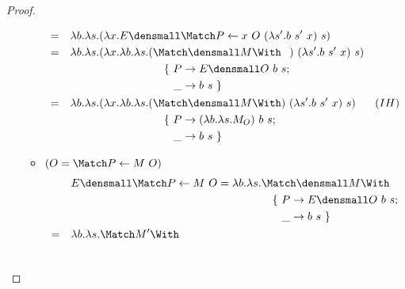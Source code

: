 \begin{proof}
\begin{enumerate}[(a)]
\begin{itemize}
\begin{align*}
            =& \quad \lambda b. \lambda s. (\lambda x. E\den{\Match P \gets x ~ O} ~ (\lambda s'. b ~ s' ~ x) ~ s) \\
            =& \quad \lambda b. \lambda s. (\lambda x. \lambda b. \lambda s. (
            \begin{aligned}[t]
              &\Match \den{M} \With \\
              &\quad
              \begin{aligned}[t]
                \{~
                P &\to E\den{O}~b~s; \\
                \_ &\to b~s
                ~\}
              \end{aligned}
            \end{aligned}
            )~ (\lambda s'. b ~ s' ~ x) ~ s) \\
            =& \quad \lambda b. \lambda s. (\lambda x. \lambda b. \lambda s. (
            \begin{aligned}[t]
              &\Match \den{M} \With \\
              &\quad
              \begin{aligned}[t]
                \{~
                P &\to (\lambda b. \lambda s. M_O)~b~s; \\
                \_ &\to b~s
                ~\}
              \end{aligned}
            \end{aligned}
            )~ (\lambda s'. b ~ s' ~ x) ~ s) & (IH)
            \end{align*}
    \item $(O = \Match P \gets M ~ O)$
        \begin{align*}
            & \quad E\den{\Match P \gets M ~ O} = \lambda b. \lambda s.
            \begin{aligned}[t]
              &\Match \den{M} \With \\
              &\quad
              \begin{aligned}[t]
                \{~
                P &\to E\den{O}~b~s; \\
                \_ &\to b~s
                ~\}
              \end{aligned}
            \end{aligned} \\
            =& \quad \lambda b. \lambda s.
            \begin{aligned}[t]
              &\Match M' \With \\
              &\quad
              \begin{aligned}[t]

\end{aligned}
\end{aligned}
\end{align*}
\end{itemize}
\end{enumerate}
\end{proof}
